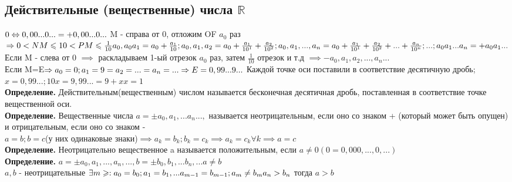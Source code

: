 \documentclass[../main.tex]{subfiles}
\begin{document}
\subsection{Действительные (вещественные) числа $\mathbb{R}$}
$0\Leftrightarrow 0,00...0...=+0,00...0...\\$
M - справа от 0, отложим OF $a_0$ раз $\implies 0<NM\leqslant 1  0<PM\leqslant \frac{1}{10}\\
a_0,a_0a_1=a_0+\frac{a_1}{10};\\
a_0,a_1,a_2=a_0+\frac{a_1}{10^1}+\frac{a_2}{10^2};\\
a_0,a_1,...,a_n=a_0+\frac{a_1}{10^1}+\frac{a_2}{10^2}+...+\frac{a_n}{10^n}; ... ; a_0a_1...a_n =+a_0a_1...$\\

Если M - слева от 0 $\implies $ раскладываем 1-ый отрезок $a_0$ раз, затем
$\frac{1}{10}$ отрезок и т.д $\implies -a_0,a_1,a_2,...,a_n...$\\
Если M=E$\implies a_0=0;a_1=9=a_2=...=a_n=...\implies E=0,99...9...\\$
Каждой точке оси поставили в соответствие десятичную дробь; $x=0,99...; 10x=9,99...=9+x x=1$\\
\textbf{Определение.} Действительным(вещественным) числом называется бесконечная десятичная дробь, поставленная в соответствие точке вещественной оси.\\
\textbf{Определение.} Вещественные числа $a=\pm a_0,a_1,...a_n...,$ называется неотрицательным, если оно со знаком +
(который может быть опущен) и отрицательным, если оно со знаком -\\
$a=b;b=c$(у них одинаковые знаки)$\implies a_k=b_k; b_k=c_k \implies a_k=c_k \forall k\implies a=c$\\
\textbf{Определение.} Неотрицательно вещественное a называется положительным, если $a\neq 0(0=0,000,...,0,...)$\\
\textbf{Определение.} $a=\pm a_0,a_1,...,a_n,..., b=\pm b_0,b_1,...b_n,... a\neq b$\\
$a,b$ - неотрицательные $\exists m\geqslant:a_0=b_0;a_1=b_1,...a_{m-1}=b_{m-1}; a_m\neq b_m\\
a_n>b_n$ тогда $a>b$\\
\end{document}
